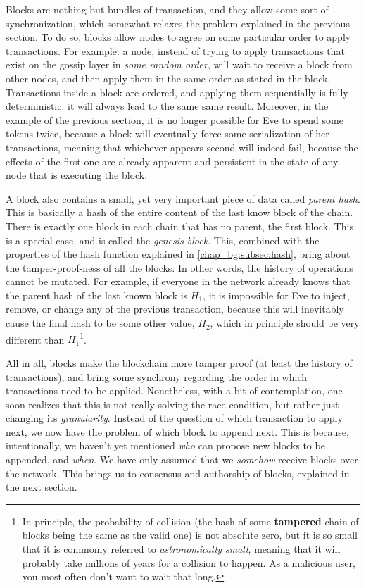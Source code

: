 Blocks are nothing but bundles of transaction, and they allow some sort of synchronization, which
somewhat relaxes the problem explained in the previous section. To do so, blocks allow nodes to
agree on some particular order to apply transactions. For example: a node, instead of trying to
apply transactions that exist on the gossip layer in \textit{some random order}, will wait to
receive a block from other nodes, and then apply them in the same order as stated in the block.
Transactions inside a block are ordered, and applying them sequentially is fully deterministic: it
will always lead to the same same result. Moreover, in the example of the previous section, it is no
longer possible for Eve to spend some tokens twice, because a block will eventually force some
serialization of her transactions, meaning that whichever appears second will indeed fail, because
the effects of the first one are already apparent and persistent in the state of any node that is
executing the block.

A block also contains a small, yet very important piece of data called \textit{parent hash}. This is
basically a hash of the entire content of the last know block of the chain. There is exactly one
block in each chain that has no parent, the first block. This is a special case, and is called the
\textit{genesis block}. This, combined with the properties of the hash function explained in
\ref{chap_bg:subsec:hash}, bring about the tamper-proof-ness of all the blocks. In other words, the
history of operations cannot be mutated. For example, if everyone in the network already knows that
the parent hash of the last known block is $H_1$, it is impossible for Eve to inject, remove, or
change any of the previous transaction, because this will inevitably cause the final hash to be some
other value, $H_2$, which in principle should be very different than $H_1$\footnote{In principle,
the probability of collision (the hash of some \textbf{tampered} chain of blocks being the same as
the valid one) is not absolute zero, but it is so small that it is commonly referred to
\textit{astronomically small}, meaning that it will probably take millions of years for a collision
to happen. As a malicious user, you most often don't want to wait that long.}.

All in all, blocks make the blockchain more tamper proof (at least the history of transactions), and
bring some synchrony regarding the order in which transactions need to be applied. Nonetheless, with
a bit of contemplation, one soon realizes that this is not really solving the race condition, but
rather just changing its \textit{granularity}. Instead of the question of which transaction to apply
next, we now have the problem of which block to append next. This is because, intentionally, we
haven't yet mentioned \textit{who} can propose new blocks to be appended, and \textit{when}. We have
only assumed that we \textit{somehow} receive blocks over the network. This brings us to consensus
and authorship of blocks, explained in the next section.

